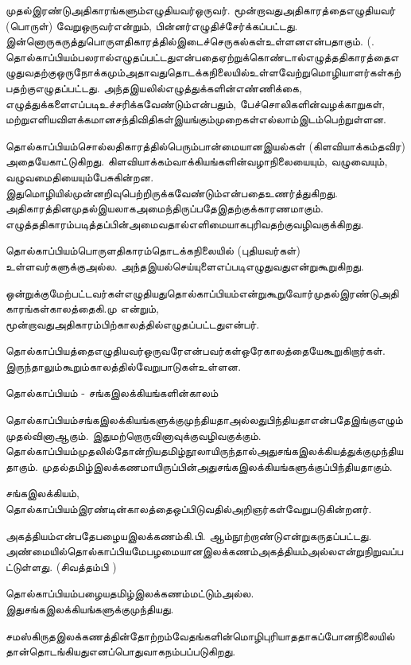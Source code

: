  \item முதல்இரண்டுஅதிகாரங்களும்எழுதியவர்ஒருவர். மூன்றாவதுஅதிகாரத்தைஎழுதியவர் (பொருள்) வேறுஒருவர்என்றும், பின்னர்எழுதிச்சேர்க்கப்பட்டது. இன்னொருகருத்துபொருளதிகாரத்தில்இடைச்செருகல்கள்உள்ளனஎன்பதாகும். (. தொல்காப்பியம்பலரால்எழுதப்பட்டதுஎன்பதைஏற்றுக்கொண்டால்எழுத்ததிகாரத்தைஎழுதுவதற்குஒருநோக்கமும்அதாவதுதொடக்கநிலையில்உள்ளவேற்றுமொழியாளர்கள்கற்பதற்குஎழுதப்பட்டது. அந்தஇயலில்எழுத்துக்களின்எண்ணிக்கை, எழுத்துக்களைஎப்படிஉச்சரிக்கவேண்டும்என்பதும், பேச்சொலிகளின்வழக்காறுகள், மற்றுஎளியவிளக்கமானசந்திவிதிகள்இயங்கும்முறைகள்எல்லாம்இடம்பெற்றுள்ளன.

தொல்காப்பியம்சொல்லதிகாரத்தில்பெரும்பான்மையானஇயல்கள் (கிளவியாக்கம்தவிர) அதையேகாட்டுகிறது. கிளவியாக்கம்வாக்கியங்களின்வழாநிலையையும், வழுவையும், வழுவமைதியையும்பேசுகின்றன. இதுமொழியில்முன்னறிவுபெற்றிருக்கவேண்டும்என்பதைஉணர்த்துகிறது. அதிகாரத்தினமுதல்இயலாகஅமைந்திருப்பதேஇதற்குக்காரணமாகும். எழுத்ததிகாரம்படித்தப்பின்அமைவதால்எளிமையாகபுரிவதற்குவழிவகுக்கிறது.

தொல்காப்பியம்பொருளதிகாரம்தொடக்கநிலையில் (புதியவர்கள்) உள்ளவர்களுக்குஅல்ல. அந்தஇயல்செய்யுளைஎப்படிஎழுதுவதுஎன்றுகூறுகிறது.

ஒன்றுக்குமேற்பட்டவர்கள்எழுதியதுதொல்காப்பியம்என்றுகூறுவோர்முதல்இரண்டுஅதிகாரங்கள்காலத்தைகி.மு என்றும், மூன்றாவதுஅதிகாரம்பிற்காலத்தில்எழுதப்பட்டதுஎன்பர்.

தொல்காப்பியத்தைஎழுதியவர்ஒருவரேஎன்பவர்கள்ஒரேகாலத்தையேகூறுகிறார்கள். இருந்தாலும்கூறும்காலத்தில்வேறுபாடுகள்உள்ளன.

தொல்காப்பியம் - சங்கஇலக்கியங்களின்காலம்

தொல்காப்பியம்சங்கஇலக்கியங்களுக்குமுந்தியதாஅல்லதுபிந்தியதாஎன்பதேஇங்குஎழும்முதல்வினாஆகும். இதுமற்றொருவினாவுக்குவழிவகுக்கும். தொல்காப்பியம்முதலில்தோன்றியதமிழ்நூலாயிருந்தால்அதுசங்கஇலக்கியத்துக்குமுந்தியதாகும். முதல்தமிழ்இலக்கணமாயிருப்பின்அதுசங்கஇலக்கியங்களுக்குப்பிந்தியதாகும். 

சங்கஇலக்கியம், தொல்காப்பியம்இரண்டின்காலத்தைஒப்பிடுவதில்அறிஞர்கள்வேறுபடுகின்றனர்.

\item அகத்தியம்என்பதேபழையஇலக்கணம்கி.பி. ஆம்நூற்றாண்டுஎன்றுகருதப்பட்டது. அண்மையில்தொல்காப்பியமேபழமையானஇலக்கணம்அகத்தியம்அல்லஎன்றுநிறுவப்பட்டுள்ளது. (சிவத்தம்பி )

 \item தொல்காப்பியம்பழையதமிழ்இலக்கணம்மட்டும்அல்ல. இதுசங்கஇலக்கியங்களுக்குமுந்தியது.

சமஸ்கிருதஇலக்கணத்தின்தோற்றம்வேதங்களின்மொழிபுரியாததாகப்போனநிலையில்தான்தொடங்கியதுஎனப்பொதுவாகநம்பப்படுகிறது. 

